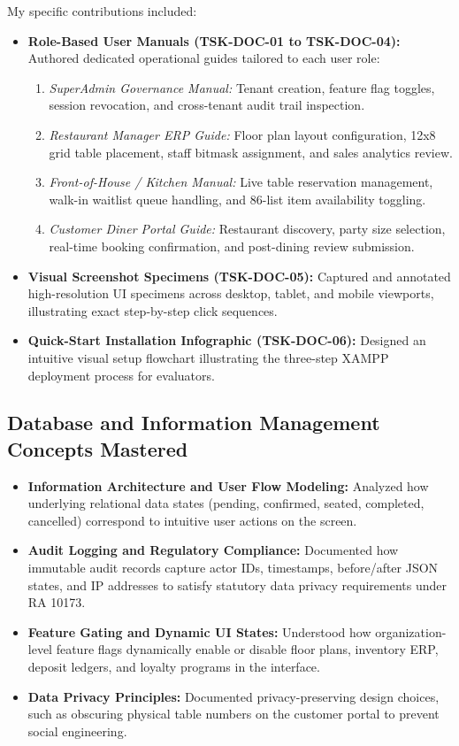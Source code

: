 My specific contributions included:
\begin{itemize}
    \item \textbf{Role-Based User Manuals (TSK-DOC-01 to TSK-DOC-04):} Authored dedicated operational guides tailored to each user role:
    \begin{enumerate}
        \item \textit{SuperAdmin Governance Manual:} Tenant creation, feature flag toggles, session revocation, and cross-tenant audit trail inspection.
        \item \textit{Restaurant Manager ERP Guide:} Floor plan layout configuration, 12x8 grid table placement, staff bitmask assignment, and sales analytics review.
        \item \textit{Front-of-House / Kitchen Manual:} Live table reservation management, walk-in waitlist queue handling, and 86-list item availability toggling.
        \item \textit{Customer Diner Portal Guide:} Restaurant discovery, party size selection, real-time booking confirmation, and post-dining review submission.
    \end{enumerate}
    \item \textbf{Visual Screenshot Specimens (TSK-DOC-05):} Captured and annotated high-resolution UI specimens across desktop, tablet, and mobile viewports, illustrating exact step-by-step click sequences.
    \item \textbf{Quick-Start Installation Infographic (TSK-DOC-06):} Designed an intuitive visual setup flowchart illustrating the three-step XAMPP deployment process for evaluators.
\end{itemize}

\subsection{Database and Information Management Concepts Mastered}
\begin{itemize}
    \item \textbf{Information Architecture and User Flow Modeling:} Analyzed how underlying relational data states (pending, confirmed, seated, completed, cancelled) correspond to intuitive user actions on the screen.
    \item \textbf{Audit Logging and Regulatory Compliance:} Documented how immutable audit records capture actor IDs, timestamps, before/after JSON states, and IP addresses to satisfy statutory data privacy requirements under RA 10173.
    \item \textbf{Feature Gating and Dynamic UI States:} Understood how organization-level feature flags dynamically enable or disable floor plans, inventory ERP, deposit ledgers, and loyalty programs in the interface.
    \item \textbf{Data Privacy Principles:} Documented privacy-preserving design choices, such as obscuring physical table numbers on the customer portal to prevent social engineering.
\end{itemize}

